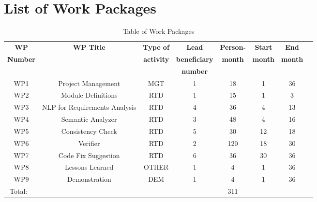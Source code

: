 \section{List of Work Packages}

\begin{table}[hbpt]\centering
	\begin{adjustbox}{width=1\textwidth}
		\begin{tabular}{ |c|c|c|c|c|c|c|c|} 
			\hline
			\textbf{WP} & \textbf{WP Title} & \textbf{Type of} & \textbf{Lead} & \textbf{Person-} & \textbf{Start} & \textbf{End} \\
			\textbf{Number} & \textbf{~} & \textbf{activity} & \textbf{beneficiary} & \textbf{month} & \textbf{month} & \textbf{month}  \\
			~ & ~ & ~ & \textbf{number} & ~ & ~ & ~ \\
			\hline
			
			WP1 & Project Management & MGT & 1 & 18 & 1 & 36 \\
			\hline
			
			WP2 & Module Definitions & RTD & 1 & 15 & 1 & 3\\
			\hline
			
			WP3 & NLP for Requirements Analysis& RTD & 4 & 36 & 4 & 13\\
			\hline
			
			WP4 & Semantic Analyzer & RTD & 3 & 48 & 4 & 16\\
			\hline
			
			WP5 & Consistency Check & RTD & 5 & 30 & 12 & 18\\
			\hline
			
			WP6 & Verifier & RTD & 2 & 120 & 18 & 30\\
			\hline
			
			WP7 & Code Fix Suggestion & RTD & 6 & 36 & 30 & 36\\
			\hline
			
			WP8 & Lessons Learned & OTHER & 1 & 4 & 1 & 36\\
			\hline
			
			WP9 & Demonstration & DEM & 1 & 4 & 1 & 36\\
			\hline
			\hline
			
			Total: ~ & ~ & ~ & ~ & 311 & ~ &	\\
			\hline
		\end{tabular}
	\end{adjustbox}
	\caption{Table of Work Packages}
\end{table}
